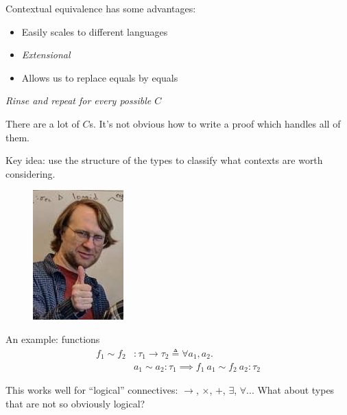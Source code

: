 \documentclass{beamer}
\newcommand{\fn}[2]{\ensuremath{#1 \to #2}}
\newcommand{\ap}[2]{\ensuremath{#1\ #2}}
\begin{document}
\begin{frame}
  Contextual equivalence has some advantages:
  \begin{itemize}
  \item Easily scales to different languages
  \item \emph{Extensional}
  \item Allows us to replace equals by equals
  \end{itemize}
\end{frame}

\begin{frame}
  \begin{center}
    \it Rinse and repeat for every possible $C$
  \end{center}
  \pause
  There are a lot of $C$s.
  \pause
  It's not obvious how to write a proof which handles all of them.
\end{frame}

\begin{frame}
  \centering
  Key idea: use {\color<2>{PaleGray} the structure of the} types
  { to classify what contexts are worth considering.}
  \pause
  \bigskip

  \begin{figure}
    \includegraphics[height=5cm,keepaspectratio]{happy-karl}
  \end{figure}
\end{frame}

\begin{frame}
  \centering
  An example: functions
  \pause
  \bigskip
  \begin{align*}
    f_1 \sim f_2 &: \fn{\tau_1}{\tau_2} \triangleq \forall a_1, a_2.\\
    &a_1 \sim a_2 : \tau_1 \implies \ap{f_1}{a_1} \sim \ap{f_2}{a_2} : \tau_2
  \end{align*}
\end{frame}

\begin{frame}
  This works well for ``logical'' connectives: $\to$, $\times$, $+$,
  $\exists$, $\forall$...
  \pause
  \bigskip
  What about types that are not so obviously logical?
\end{frame}
\end{document}

